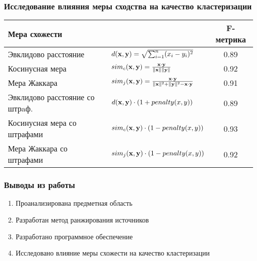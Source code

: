\documentclass[hyperref={unicode}, 14pt, aspectratio=169]{beamer}
\begin{document}
\begin{frame}
    \frametitle{Исследование влияния меры сходства на качество кластеризации}

    \begin{table}
        \begin{center}\small
            \begin{tabular}{l l | c}
                \hline
                Мера схожести & & F-метрика \\ \hline\hline
                Эвклидово расстояние &
                $d(\boldsymbol{\mathbf{x}},\boldsymbol{\mathbf{y}})=\sqrt{\sum_{i=1}^n(x_i-y_i)^2}$
                & 0.89 \\ \hline
                Косинусная мера &
                $sim_c(\boldsymbol{\mathbf{x}},\boldsymbol{\mathbf{y}})=\frac{\boldsymbol{\mathbf{x}}\cdot\boldsymbol{\mathbf{y}}}{\lVert\boldsymbol{\mathbf{x}}\rVert\lVert\boldsymbol{\mathbf{y}}\rVert}$
                & 0.92 \\ \hline
                Мера Жаккара &
                $sim_j(\boldsymbol{\mathbf{x}},\boldsymbol{\mathbf{y}})=\frac{\boldsymbol{\mathbf{x}}\cdot\boldsymbol{\mathbf{y}}}{\lVert\boldsymbol{\mathbf{x}}\rVert^2 + \lVert\boldsymbol{\mathbf{y}}\rVert^2-\boldsymbol{\mathbf{x}}\cdot\boldsymbol{\mathbf{y}}}$
                & 0.91 \\ \hline
                Эвклидово расстояние со штрaф. &
                $d(\boldsymbol{\mathbf{x}},\boldsymbol{\mathbf{y}})\cdot(1+penalty(x,y))$
                & 0.89 \\ \hline
                \rowcolor[gray]{0.7}
                Косинусная мера со штрафами &
                $sim_c(\boldsymbol{\mathbf{x}},\boldsymbol{\mathbf{y}})\cdot(1-penalty(x,y))$
                & 0.93 \\ \hline
                Мера Жаккара со штрафами &
                $sim_j(\boldsymbol{\mathbf{x}},\boldsymbol{\mathbf{y}})\cdot(1-penalty(x,y))$
                & 0.92 \\
                \hline
            \end{tabular}
        \end{center}
    \end{table}
\end{frame}

\begin{frame}
    \frametitle{Выводы из работы}

    \begin{block}{}
        \begin{enumerate}
            \item Проанализирована предметная область
            \item Разработан метод ранжирования источников
            \item Разработано программное обеспечение
            \item Исследовано влияние меры схожести на качество кластеризации
        \end{enumerate}
    \end{block}
\end{frame}
\end{document}
